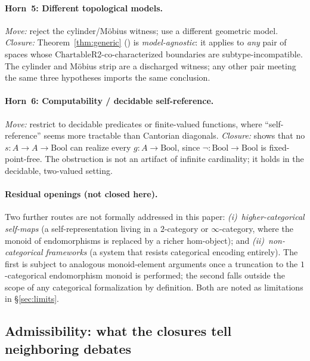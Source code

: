 \documentclass[11pt]{article}
\begin{document}
\paragraph{Horn~5: Different topological models.}
\emph{Move:} reject the cylinder/M\"obius witness; use a different geometric
model.
\emph{Closure:} Theorem~\ref{thm:generic}
()
is \emph{model-agnostic}: it applies to \emph{any} pair of spaces whose
$\mathrm{ChartableR2}$-co-characterized boundaries are subtype-incompatible.
The cylinder and M\"obius strip are a discharged witness;
any other pair meeting the same three hypotheses imports the same conclusion.

\paragraph{Horn~6: Computability / decidable self-reference.}
\emph{Move:} restrict to decidable predicates or finite-valued functions,
where ``self-reference'' seems more tractable than Cantorian diagonals.
\emph{Closure:}
shows that no $s : A \to A \to \mathrm{Bool}$ can realize every
$g : A \to \mathrm{Bool}$, since $\lnot : \mathrm{Bool} \to \mathrm{Bool}$
is fixed-point-free.  The obstruction is not an artifact of infinite
cardinality; it holds in the decidable, two-valued setting.

\paragraph{Residual openings (not closed here).}
Two further routes are not formally addressed in this paper:
\emph{(i)}~\emph{higher-categorical self-maps} (a self-representation
living in a $2$-category or $\infty$-category, where the monoid of
endomorphisms is replaced by a richer hom-object); and
\emph{(ii)}~\emph{non-categorical frameworks} (a system that resists
categorical encoding entirely).  The first is subject to analogous
monoid-element arguments once a truncation to the $1$-categorical
endomorphism monoid is performed; the second falls outside the scope of
any categorical formalization by definition.  Both are noted as
limitations in \S\ref{sec:limits}.

\subsection{Admissibility: what the closures tell neighboring debates}
\label{sec:admissibility}
\end{document}
